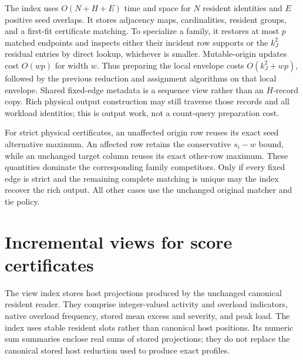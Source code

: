 \documentclass[11pt]{article}
\begin{document}
The index uses $O(N+H+E)$ time and space for $N$ resident identities and $E$ positive seed overlaps. It stores adjacency maps, cardinalities, resident groups, and a first-fit certificate matching. To specialize a family, it restores at most $p$ matched endpoints and inspects either their incident row supports or the $k_J^2$ residual entries by direct lookup, whichever is smaller. Mutable-origin updates cost $O(wp)$ for width $w$. Thus preparing the local envelope costs $O(k_J^2+wp)$, followed by the previous reduction and assignment algorithms on that local envelope. Shared fixed-edge metadata is a sequence view rather than an $H$-record copy. Rich physical output construction may still traverse those records and all workload identities; this is output work, not a count-query preparation cost.

For strict physical certificates, an unaffected origin row reuses its exact seed alternative maximum. An affected row retains the conservative $s_i-w$ bound, while an unchanged target column reuses its exact other-row maximum. These quantities dominate the corresponding family competitors. Only if every fixed edge is strict and the remaining complete matching is unique may the index recover the rich output. All other cases use the unchanged original matcher and tie policy.

\section{Incremental views for score certificates}\label{sec:bound-view-index}
The view index stores host projections produced by the unchanged canonical resident reader. They comprise integer-valued activity and overload indicators, native overload frequency, stored mean excess and severity, and peak load. The index uses stable resident slots rather than canonical host positions. Its numeric sum summaries enclose real sums of stored projections; they do not replace the canonical stored host reduction used to produce exact profiles.
\end{document}

